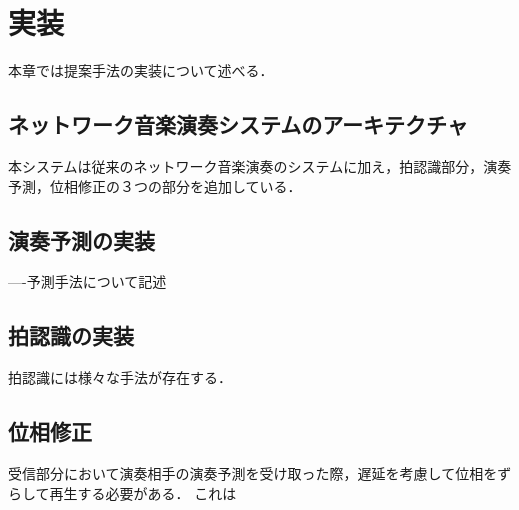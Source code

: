 \chapter{実装}
\label{implementation}

本章では提案手法の実装について述べる．

\section{ネットワーク音楽演奏システムのアーキテクチャ}
本システムは従来のネットワーク音楽演奏のシステムに加え，拍認識部分，演奏予測，位相修正の３つの部分を追加している．

\section{演奏予測の実装}
----予測手法について記述

\section{拍認識の実装}
拍認識には様々な手法が存在する．

\section{位相修正}
受信部分において演奏相手の演奏予測を受け取った際，遅延を考慮して位相をずらして再生する必要がある．
これは

